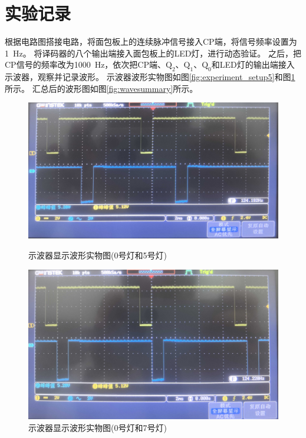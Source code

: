 \documentclass[zihao=-4]{ctexart} %
\begin{document}
\section{实验记录}
根据电路图搭接电路，将面包板上的连续脉冲信号接入CP端，将信号频率设置为\SI{1}{\hertz}。
将译码器的八个输出端接入面包板上的LED灯，进行动态验证。
之后，把CP信号的频率改为\SI{1000}{\hertz}，依次把CP端、$\mathrm{Q_2}$、$\mathrm{Q_1}$、$\mathrm{Q_0}$和LED灯的输出端接入示波器，观察并记录波形。
示波器波形实物图如图\ref{fig:experiment_setup5}和图\ref{fig:experiment_setup7}所示。
汇总后的波形图如图\ref{fig:wavesummary}所示。
\begin{figure}[htbp]
    \centering
    \begin{minipage}[t]{0.48\textwidth}
        \centering
        \includegraphics[width=\textwidth]{../Ex1/img/05.jpg}
        \caption{示波器显示波形实物图(0号灯和5号灯)}
        \label{fig:experiment_setup5}
    \end{minipage}
    \hfill
    \begin{minipage}[t]{0.48\textwidth}
        \centering
        \includegraphics[width=\textwidth]{../Ex1/img/07.jpg}
        \caption{示波器显示波形实物图(0号灯和7号灯)}
        \label{fig:experiment_setup7}
    \end{minipage}
\end{figure}
\end{document}
